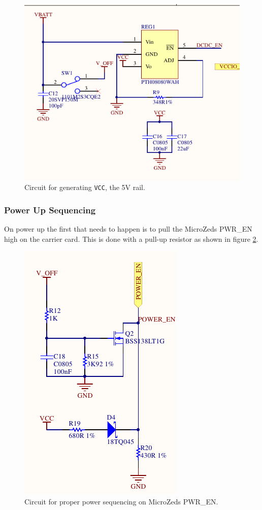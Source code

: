 \begin{figure}
	\centering
	\includegraphics[width=\linewidth]{graphics/5v.pdf}
	\caption{Circuit for generating \texttt{VCC}, the 5V rail.}
	\label{fig:pth08080}
\end{figure}

\subsubsection*{Power Up Sequencing}
On power up the first that needs to happen is to pull the MicroZeds PWR\_EN high on the carrier card.
This is done with a pull-up resistor as shown in figure \ref{fig:pwr_en_circuit}.

\begin{figure}
	\centering
	\includegraphics[width=.4\linewidth]{graphics/power_en_sch.pdf}
	\caption{Circuit for proper power sequencing on MicroZeds PWR\_EN.}
	\label{fig:pwr_en_circuit}
\end{figure}

